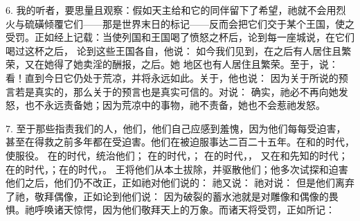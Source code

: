 6. 我的听者，要思量且观察：假如天主给和它的同伴留下了希望，祂就不会用烈火与硫磺倾覆它们——那是世界末日的标记——反而会把它们交于某个王国，使之受罚。正如经上记载：当使列国和王国喝了愤怒之杯后，论到每一座城说，在它们喝过这杯之后， 论到这些王国各自，他说： 如今我们见到，在之后有人居住且繁荣，又在她得了她卖淫的酬报，之后。她 地区也有人居住且繁荣。至于，说：  看！直到今日它仍处于荒凉，并将永远如此。关于，他也说：  因为关于所说的预言若是真实的，那么关于的预言也是真实可信的。对说：  确实，祂必不再向她发怒，也不永远责备她；因为荒凉中的事物，祂不责备，她也不会惹祂发怒。\par

7. 至于那些指责我们的人，他们，他们自己应感到羞愧，因为他们每每受迫害，甚至在得救之前多年都在受迫害。他们在被迫服事达二百二十五年。在和的时代，使服役。 在的时代，统治他们； 在的时代，； 在的时代，， 又在和先知的时代； 在的时代，；在的时代，。 王将他们从本土拔除，并驱散他们；他多次试探和迫害他们之后，他们仍不改正，正如祂对他们说的：  祂又说：  祂对说：  但是他们离弃了祂，敬拜偶像，正如论到他们说：  因为破裂的蓄水池就是对雕像和偶像的畏惧。祂呼唤诸天惊愕，因为他们敬拜天上的万象。而诸天将受罚，正如所记： \par

